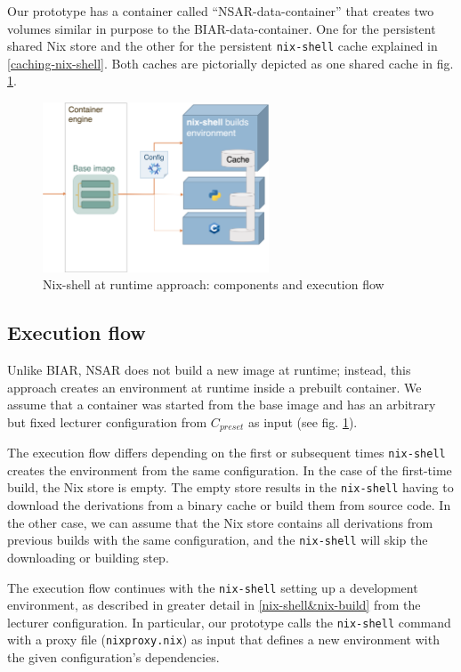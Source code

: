 Our prototype has a container called ``NSAR-data-container'' that creates two volumes similar in purpose to the BIAR-data-container. One for the persistent shared Nix store and the other for the persistent \verb|nix-shell| cache explained in \ref{caching-nix-shell}. Both caches are pictorially depicted as one shared cache in fig. \ref{fig:NSAR-execution-flow}.

\begin{figure}[h!]
   \centering
   \includegraphics[width=0.6\textwidth]{thesis/graphics/NSAR-execution-flow.png}
   \caption{Nix-shell at runtime approach: components and execution flow} 
   \label{fig:NSAR-execution-flow}
\end{figure}

\subsection{Execution flow}
Unlike BIAR, NSAR does not build a new image at runtime; instead, this approach creates an environment at runtime inside a prebuilt container. We assume that a container was started from the base image and has an arbitrary but fixed lecturer configuration from $C_{preset}$ as input (see fig. \ref{fig:NSAR-execution-flow}).

The execution flow differs depending on the first or subsequent times \verb|nix-shell| creates the environment from the same configuration. In the case of the first-time build, the Nix store is empty. The empty store results in the \verb|nix-shell| having to download the derivations from a binary cache or build them from source code. In the other case, we can assume that the Nix store contains all derivations from previous builds with the same configuration, and the \verb|nix-shell| will skip the downloading or building step.

The execution flow continues with the \verb|nix-shell| setting up a development environment, as described in greater detail in \ref{nix-shell&nix-build} from the lecturer configuration. In particular, our prototype calls the \verb|nix-shell| command with a proxy file (\verb|nixproxy.nix|) as input that defines a new environment with the given configuration's dependencies. 


